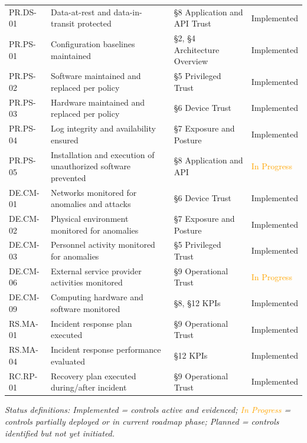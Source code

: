 \documentclass[11pt,landscape]{article}
\begin{document}
\begin{longtable}{lp{3in}p{2in}l}
PR.DS-01 & Data-at-rest and data-in-transit protected & §8 Application and API Trust & \textcolor{stridegreen}{Implemented} \\
PR.PS-01 & Configuration baselines maintained & §2, §4 Architecture Overview & \textcolor{stridegreen}{Implemented} \\
PR.PS-02 & Software maintained and replaced per policy & §5 Privileged Trust & \textcolor{stridegreen}{Implemented} \\
PR.PS-03 & Hardware maintained and replaced per policy & §6 Device Trust & \textcolor{stridegreen}{Implemented} \\
PR.PS-04 & Log integrity and availability ensured & §7 Exposure and Posture & \textcolor{stridegreen}{Implemented} \\
PR.PS-05 & Installation and execution of unauthorized software prevented & §8 Application and API & \textcolor{orange}{In Progress} \\
DE.CM-01 & Networks monitored for anomalies and attacks & §6 Device Trust & \textcolor{stridegreen}{Implemented} \\
DE.CM-02 & Physical environment monitored for anomalies & §7 Exposure and Posture & \textcolor{stridegreen}{Implemented} \\
DE.CM-03 & Personnel activity monitored for anomalies & §5 Privileged Trust & \textcolor{stridegreen}{Implemented} \\
DE.CM-06 & External service provider activities monitored & §9 Operational Trust & \textcolor{orange}{In Progress} \\
DE.CM-09 & Computing hardware and software monitored & §8, §12 KPIs & \textcolor{stridegreen}{Implemented} \\
RS.MA-01 & Incident response plan executed & §9 Operational Trust & \textcolor{stridegreen}{Implemented} \\
RS.MA-04 & Incident response performance evaluated & §12 KPIs & \textcolor{stridegreen}{Implemented} \\
RC.RP-01 & Recovery plan executed during/after incident & §9 Operational Trust & \textcolor{stridegreen}{Implemented} \\
\bottomrule
\end{longtable}

{\small\textit{Status definitions: \textcolor{stridegreen}{Implemented} = controls active and evidenced;
\textcolor{orange}{In Progress} = controls partially deployed or in current roadmap phase;
\textcolor{gapred}{Planned} = controls identified but not yet initiated.}}
\end{document}

